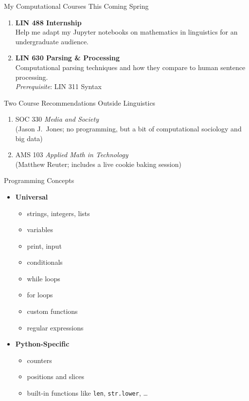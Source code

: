 \documentclass[xcolor={usenames,svgnames,x11names,dvipsnames,table}]{beamer}
\begin{document}
\begin{frame}{My Computational Courses This Coming Spring}
    \begin{enumerate}
        \item \textbf{LIN 488 Internship}\\
            Help me adapt my Jupyter notebooks on mathematics in linguistics for an undergraduate audience.
        \item \textbf{LIN 630 Parsing \& Processing}\\
            Computational parsing techniques and how they compare to human sentence processing.\\
            \emph{Prerequisite}: LIN 311 Syntax
    \end{enumerate}
\end{frame}

\begin{frame}{Two Course Recommendations Outside Linguistics}
    \begin{enumerate}
        \item SOC 330 \emph{Media and Society}\\
            (Jason J.~Jones; no programming, but a bit of computational sociology and big data)
        \item AMS 103 \emph{Applied Math in Technology}\\
            (Matthew Reuter; includes a live cookie baking session)
    \end{enumerate}
\end{frame}

\begin{frame}{Programming Concepts}
    \begin{itemize}
        \item \textbf{Universal}
            \begin{itemize}
                \item strings, integers, lists
                \item variables
                \item print, input
                \item conditionals
                \item while loops
                \item for loops
                \item custom functions
                \item regular expressions
            \end{itemize}
        \item \textbf{Python-Specific}
            \begin{itemize}
                \item counters
                \item positions and slices
                \item built-in functions like \texttt{len}, \texttt{str.lower}, \ldots
            \end{itemize}
    \end{itemize}
\end{frame}
\end{document}
